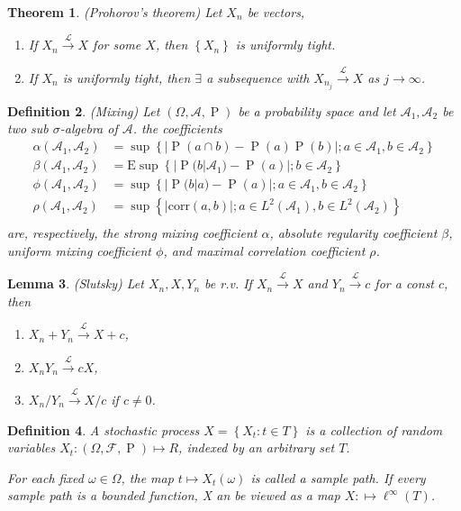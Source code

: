 \documentclass[12pt,a4paper]{article}
\newcommand{\E}{\mathop{\mathbb{E}}}
\newcommand{\pr}{\mathop{\mathrm{P}}}
\def \corr{\mbox{corr}}
\def \indist {\stackrel{\mathcal{L}}{\longrightarrow}}
\def \E{\mbox{E}}
\def \calA {\mathcal{A}}
\def \F {\mathcal{F}}
\newtheorem{theorem}{Theorem}[section]
\newtheorem{lemma}[theorem]{Lemma}
\newtheorem{definition}[theorem]{Definition}
\begin{document}
  
\begin{theorem}
  (Prohorov's theorem)
  Let $X_n$ be vectors,
  \begin{enumerate}
	\item If $X_n\indist X$ for some $X$, then $\left\{ X_n \right\}$ is uniformly tight.
	\item If $X_n$ is uniformly tight, then $\exists $ a subsequence with $X_{n_j}\indist X$ as $j\to\infty$.
  \end{enumerate}
  \label{thm:Prohorov}
\end{theorem}

\begin{definition}\citep[Section 3.1]{NzeDoukhan2004}
  (Mixing) 
  Let $(\Omega,\calA,\pr)$ be a probability space and let $\calA_1,\calA_2$ be two sub $\sigma$-algebra of $\calA$. the coefficients
  \begin{align*}
	\alpha(\calA_1,\calA_2) &= \sup\left\{ |\pr(a\cap b) - \pr(a)\pr(b)|;a\in\calA_1,b\in\calA_2 \right\}\\
	\beta(\calA_1,\calA_2) &= \E \sup\left\{ |\pr(b|\calA_1) - \pr(a)|;b\in\calA_2 \right\}\\
	\phi(\calA_1,\calA_2) &= \sup\left\{ |\pr(b|a) - \pr(a)|;a\in\calA_1,b\in\calA_2 \right\}\\
	\rho(\calA_1,\calA_2) &= \sup\left\{ |\corr(a,b)|;a\in L^2(\calA_1),b\in L^2(\calA_2) \right\}\\
  \end{align*}
  are, respectively, the strong mixing coefficient $\alpha$, absolute regularity coefficient $\beta$, uniform mixing coefficient $\phi$, and maximal correlation coefficient $\rho$.
\end{definition}
\begin{lemma}
  (Slutsky)
  Let $X_n,X,Y_n$ be r.v. If $X_n\indist X$ and $Y_n\indist c$ for a const $c$, then
  \begin{enumerate}
	\item $X_n+Y_n \indist X+c$,
	\item $X_nY_n\indist cX$,
	\item $X_n/Y_n\indist X/c$ if $c\ne 0$.
  \end{enumerate}
  \label{lem:Slutsky}
\end{lemma}


\begin{definition}
  A stochastic process $X=\left\{ X_t:t\in T \right\}$ is a collection of random variables $X_t:(\Omega,\F, \pr)\mapsto R$, 
  indexed by an arbitrary set $T$.
  
  For each fixed $\omega\in \Omega$, the map $t\mapsto X_t(\omega)$ is called a sample path.
  If every sample path is a bounded function, X an be viewed as a map $X:\mapsto \ell^\infty(T)$.
\end{definition}
\end{document}
